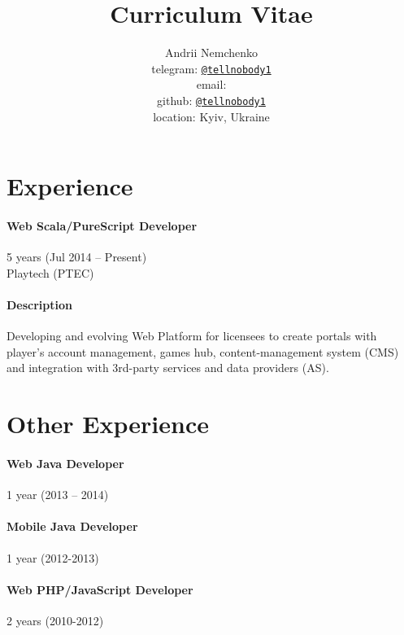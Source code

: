 

\title{Curriculum Vitae}
\author{
  Andrii Nemchenko\\
  telegram: \href{https://t.me/tellnobody1}{\nolinkurl{@tellnobody1}}\\
  email: \\
  github: \href{https://github.com/tellnobody1}{\nolinkurl{@tellnobody1}}\\
  location: Kyiv, Ukraine
}
\maketitle

\section{Experience}
\paragraph{Web Scala/PureScript Developer}
5 years (Jul 2014 – Present)\\Playtech (PTEC)
\paragraph{Description}
Developing and evolving Web Platform for licensees to create portals with player's account management, games hub, content-management system (CMS) and integration with 3rd-party services and data providers (AS).

\section{Other Experience}
\paragraph{Web Java Developer}
1 year (2013 – 2014)

\paragraph{Mobile Java Developer}
1 year (2012-2013)

\paragraph{Web PHP/JavaScript Developer}
2 years (2010-2012)

